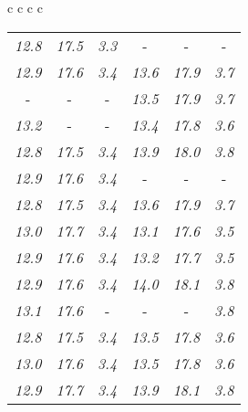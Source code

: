 \documentclass[sigplan,screen]{acmart}
\makeatletter
\newcommand{\ccell}[3][]{%
  \kern-\fboxsep
  \if\relax\detokenize{#1}\relax
    \expandafter\@firstoftwo
  \else
    \expandafter\@secondoftwo
  \fi
  {\colorbox{#2}}%
  {\colorbox[#1]{#2}}%
  {#3}\kern-\fboxsep
}
\makeatother
\begin{document}
\begin{table*}
\begin{tabular}{c c c c}
\begin{tabular}{c c c c c c}
      \rule{0pt}{4ex}    
      
      \textit{12.8} & \textit{17.5} & \textit{3.3} &  \ccell[gray]{0.9}{\textit{14.2}} &  \ccell[gray]{0.9}{\textit{18.2}} &  \ccell[gray]{0.9}{\textit{3.9}} \\
      \textit{12.9} & \textit{17.6} & \textit{3.4} & \textit{13.6} & \textit{17.9} & \textit{3.7} \\
       \ccell[gray]{0.9}{\textit{13.3}} &  \ccell[gray]{0.9}{\textit{17.8}} &  \ccell[gray]{0.9}{\textit{3.5}} & \textit{13.5} & \textit{17.9} & \textit{3.7} \\
      \textit{13.2} &  \ccell[gray]{0.9}{\textit{17.8}} &  \ccell[gray]{0.9}{\textit{3.5}} & \textit{13.4} & \textit{17.8} & \textit{3.6} \\
      \textit{12.8} & \textit{17.5} & \textit{3.4} & \textit{13.9} & \textit{18.0} & \textit{3.8} \\
      \textit{12.9} & \textit{17.6} & \textit{3.4} &  \ccell[gray]{0.9}{\textit{14.2}} &  \ccell[gray]{0.9}{\textit{18.2}} &  \ccell[gray]{0.9}{\textit{3.9}} \\
      \textit{12.8} & \textit{17.5} & \textit{3.4} & \textit{13.6} & \textit{17.9} & \textit{3.7} \\
      \textit{13.0} & \textit{17.7} & \textit{3.4} & \textit{13.1} & \textit{17.6} & \textit{3.5} \\
      \textit{12.9} & \textit{17.6} & \textit{3.4} & \textit{13.2} & \textit{17.7} & \textit{3.5} \\
      \textit{12.9} & \textit{17.6} & \textit{3.4} & \textit{14.0} & \textit{18.1} & \textit{3.8} \\
      \textit{13.1} & \textit{17.6} &  \ccell[gray]{0.9}{\textit{3.5}} &  \ccell[gray]{0.9}{\textit{14.2}} &  \ccell[gray]{0.9}{\textit{18.2}} & \textit{3.8} \\
      \textit{12.8} & \textit{17.5} & \textit{3.4} & \textit{13.5} & \textit{17.8} & \textit{3.6} \\
      \textit{13.0} & \textit{17.6} & \textit{3.4} & \textit{13.5} & \textit{17.8} & \textit{3.6} \\
      \textit{12.9} & \textit{17.7} & \textit{3.4} & \textit{13.9} & \textit{18.1} & \textit{3.8} \\
\end{tabular}
\\

    \end{tabular}
    
\bigskip

\end{table*}
    
\end{document}

